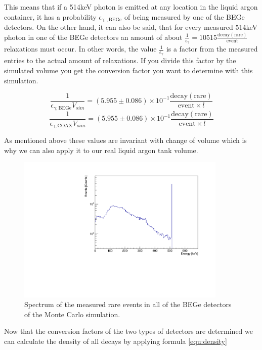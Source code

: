 This means that if a 514keV photon is emitted at any location in the liquid argon container, it has a probability \(\epsilon_{\gamma,\mathrm{,BEGe}}\) of being measured by one of the BEGe detectors.
On the other hand, it can also be said, that for every measured 514keV photon in one of the BEGe detectors an amount of about $\frac{1}{\epsilon_\gamma} = 10515 \frac{\mathrm{decay(rare)}}{\mathrm{event}}$  relaxations must occur.
In other words, the value $\frac{1}{\epsilon_\gamma}$ is a factor from the measured entries to the actual amount of  relaxations.
If you divide this factor by the simulated volume you get the conversion factor you want to determine with this simulation.

\begin{equation*}
\frac{1}{\epsilon_{\gamma\mathrm{,BEGe}} V_{sim}} = (5.955\pm0.086) \times 10^{-1} \frac{\mathrm{decay(rare)}}{\mathrm{event} \times l}
\end{equation*}
\begin{equation*}
\frac{1}{\epsilon_{\gamma\mathrm{,COAX}} V_{sim}} = (5.955\pm0.086) \times 10^{-1} \frac{\mathrm{decay(rare)}}{\mathrm{event} \times l}
\end{equation*}

As mentioned above these values are invariant with change of volume which is why we can also apply it to our real liquid argon tank volume. 
\\

\begin{figure}[t!]
	\centering
	\ifmakefigures%
	\includegraphics[width=100mm]{./Bilder/MC-514-Phasenraum.pdf}
	\fi%
	\caption{
    Spectrum of the measured rare \Kr events in all of the BEGe detectors of the Monte Carlo simulation.
	}
	\label{fig:PhasenraumMC514}
\end{figure}

Now that the conversion factors of the two types of detectors are determined we can calculate the density of all \Kr decays by applying formula \ref{equ:density}

